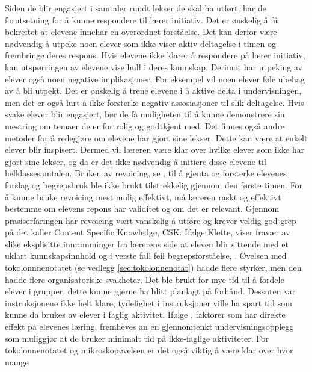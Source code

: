 \documentclass[main.tex]{subfiles}
\begin{document}
Siden de blir engasjert i samtaler rundt lekser de skal ha utført, har de forutsetning for å kunne 
respondere til lærer initiativ. Det er ønskelig å få bekreftet at elevene innehar en overordnet 
forståelse. Det kan derfor være nødvendig å utpeke noen elever som ikke viser aktiv deltagelse i 
timen og frembringe deres respons. Hvis elevene ikke klarer å respondere på lærer initiativ, kan 
utspørringen av elevene vise hull i deres kunnskap. Derimot har utpeking av elever også noen 
negative implikasjoner. For eksempel vil noen elever føle ubehag av å bli utpekt. Det er ønskelig å 
trene elevene i å aktive delta i undervisningen, men det er også lurt å ikke forsterke negativ 
assosiasjoner til slik deltagelse. Hvis svake elever blir engasjert, bør de få muligheten til å 
kunne demonstrere sin mestring om temaer de er fortrolig og godtkjent med. Det finnes også andre 
metoder for å redegjøre om elevene har gjort sine lekser. Dette kan være at enkelt elever blir 
inspisert. Dermed vil læreren være klar over hvilke elever som ikke har gjort sine lekser, og da er 
det ikke nødvendig å initiere disse elevene til helklassesamtalen.
\newline
\newline
Bruken av revoicing, se , til å gjenta og forsterke elevenes forslag og 
begrepsbruk ble ikke brukt tilstrekkelig gjennom den første timen. For å kunne bruke revoicing mest 
mulig effektivt, må læreren raskt og effektivt bestemme om elevens repons har validitet og om det er 
relevant. Gjennom prasiserfaringen har revoicing vært vanskelig å utføre og krever veldig god grep 
på det  kaller Content Specific Knowledge, CSK. Ifølge Klette, viser fravær av slike 
eksplisitte innramminger fra lærerens side at eleven blir sittende med et uklart kunnskapsinnhold og 
i verste fall feil begrepsforståelse, . 
\newline
\newline
Øvelsen med tokolonnnenotatet (se vedlegg \ref{sec:tokolonnenotat}) hadde flere styrker, men den 
hadde flere organisatoriske svakheter. Det ble brukt for mye tid til å fordele elever i grupper, 
dette kunne gjerne ha blitt planlagt på forhånd. Dessuten var instruksjonene ikke helt klare, 
tydelighet i instruksjoner ville ha spart tid som kunne da brukes av elever i faglig aktivitet. 
Ifølge , faktorer som har direkte effekt på elevenes læring, fremheves an en 
gjennomtenkt undervisningsopplegg som muliggjør at de bruker minimalt tid på ikke-faglige 
aktiviteter. For tokolonnenotatet og mikroskopøvelsen er det også viktig å være klar over hvor mange 
\end{document}
